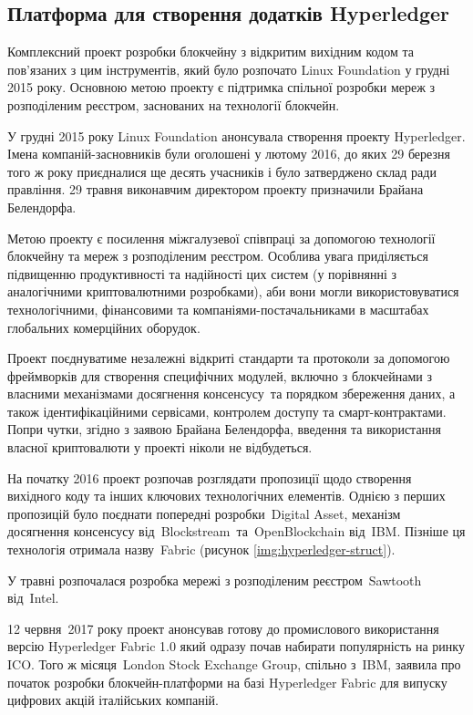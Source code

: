 \documentclass{lib/styles/default-style}
\begin{document}
\subsection{Платформа для створення додатків Hyperledger}

    Комплексний проект розробки блокчейну з відкритим вихідним кодом та пов'язаних з цим інструментів,
    який було розпочато Linux Foundation у грудні 2015 року. Основною метою проекту є підтримка спільної
    розробки мереж з розподіленим реєстром, заснованих на технології блокчейн.
    
    У грудні 2015 року Linux Foundation анонсувала створення проекту Hyperledger.
    Імена компаній-засновників були оголошені у лютому 2016, до яких 29 березня того ж року приєдналися ще
    десять учасників і було затверджено склад ради правління. 29 травня виконавчим директором проекту призначили Брайана Белендорфа.
    
    Метою проекту є посилення міжгалузевої співпраці за допомогою технології блокчейну та мереж з розподіленим реєстром.
    Особлива увага приділяється підвищенню продуктивності та надійності цих систем (у порівнянні з аналогічними криптовалютними розробками),
    аби вони могли використовуватися технологічними, фінансовими та компаніями-постачальниками в масштабах глобальних комерційних оборудок. 
    
    Проект поєднуватиме незалежні відкриті стандарти та протоколи за допомогою фреймворків для створення специфічних модулей, включно з 
    блокчейнами з власними механізмами досягнення консенсусу та порядком збереження даних, а також ідентифікаційними сервісами, контролем
    доступу та смарт-контрактами. 	Попри чутки, згідно з заявою Брайана Белендорфа, введення та використання власної криптовалюти у проекті
    ніколи не відбудеться.
    
    На початку 2016 проект розпочав розглядати пропозиції щодо створення вихідного коду
    та інших ключових технологічних елементів. Однією з перших пропозицій було поєднати попередні розробки Digital Asset,
    механізм досягнення консенсусу від Blockstream та OpenBlockchain від IBM. Пізніше ця технологія отримала назву Fabric (рисунок \ref{img:hyperledger-struct}).
    

    У травні розпочалася розробка мережі з розподіленим реєстром Sawtooth від Intel. 

    12 червня 2017 року проект анонсував готову до промислового використання версію Hyperledger Fabric 1.0 який одразу 
    почав набирати популярність на ринку ICO. Того ж місяця London Stock Exchange Group, спільно з IBM, заявила про початок
    розробки блокчейн-платформи на базі Hyperledger Fabric для випуску цифрових акцій італійських компаній. 
    
\end{document}

